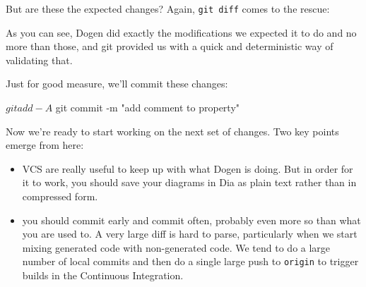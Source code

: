 \documentclass{book}
\begin{document}

But are these the expected changes? Again, \texttt{git diff} comes to
the rescue:

\begin{pseudocode}[backgroundcolor=\color{lightgray}]
$ git diff hello_world/include/hello_world/types/one_property.hpp
diff --git a/hello_world/include/hello_world/types/one_property.hpp b/hello_world/include/hello_world/types/one_property.hpp
index 1759275..b0759ec 100644
--- a/hello_world/include/hello_world/types/one_property.hpp
+++ b/hello_world/include/hello_world/types/one_property.hpp
@@ -50,6 +50,8 @@ public:
 public:
     /**
      * @brief This is a sample property.
+     *
+     * This is an additional comment.
      */
     /**@{*/
     const std::string& property() const;
\end{pseudocode}

As you can see, Dogen did exactly the modifications we expected it to
do and no more than those, and git provided us with a quick and
deterministic way of validating that.

Just for good measure, we'll commit these changes:

\begin{pseudocode}[backgroundcolor=\color{lightgray}]
$ git add -A
$ git commit -m "add comment to property"
\end{pseudocode}

Now we're ready to start working on the next set of changes. Two key
points emerge from here:

\begin{itemize}
\item VCS are really useful to keep up with what Dogen is doing. But
  in order for it to work, you should save your diagrams in Dia as
  plain text rather than in compressed form.
\item you should commit early and commit often, probably even more so
  than what you are used to. A very large diff is hard to parse,
  particularly when we start mixing generated code with non-generated
  code. We tend to do a large number of local commits and then do a
  single large push to \texttt{origin} to trigger builds in the
  Continuous Integration.
\end{itemize}
\end{document}
